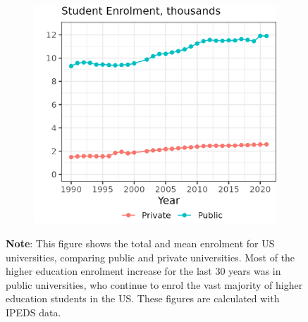 \begin{figure}[H]
\begin{subfigure}[b]{0.495\textwidth}
        \includegraphics[width=\textwidth]{figures/enrollment-mean.png}
        \label{fig:enrollment-mean}
    \end{subfigure}
    \label{fig:enrolment}
    \vspace{-1cm}
    \justify
    \footnotesize
    \textbf{Note}:
    This figure shows the total and mean enrolment for US universities, comparing public and private universities.
    Most of the higher education enrolment increase for the last 30 years was in public universities, who continue to enrol the vast majority of higher education students in the US.
    These figures are calculated with IPEDS data.
\end{figure}

